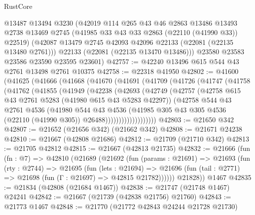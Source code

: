 \begin{lexlean}{RustCore}
\begin{coremodule}
      @13487
      @13494
      @3230
      (@42019
        @114
        @265
        @43
        @46
        @2863
        @13486
        @13493
        @2738
        @13469
        @2745
        (@41985 @33 @43 @33 @2863 (@22110 (@41990 @33)) @22519)
        (@42087 @13479 @2745 @42093 @42096 @22133 (@22081 (@22135 @13480 @2761)))
        @22133
        (@22081 (@22135 @13470 @13486)))
      @23580
      @23583
      @23586
      @23590
      @23595
      @23601)
@42757 := @42240 @13496 @615 @544 @43 @2761 @13498 @2761 @10375
@42758 := @22318 @41950
@42802 := @41600
    (@41625
      (@41666
        (@41668
          (@41670
            (@41691
              (@41709
                (@41726
                  (@41747
                    (@41758
                      (@41762
                        (@41855
                          (@41949
                            (@42238
                              (@42693
                                (@42749
                                  (@42757
                                    (@42758 @615 @43 @2761 @5283 (@41980 @615 @43 @5283 @42297))
                                    (@42758
                                      @544
                                      @43
                                      @2761
                                      @4536
                                      (@41980
                                        @544
                                        @43
                                        @4536
                                        (@41985
                                          @305
                                          @43
                                          @305
                                          @4536
                                          (@22110 (@41990 @305))
                                          @26488)))))))))))))))))))
@42803 := @21650 @342
@42807 := @21652 (@21656 @342) (@21662 @342)
@42808 := @21671 @24238
@42810 := @21667 (@42808 @21686)
@42812 := @21709 (@21710 @342)
@42813 := @21705 @42812
@42815 := @21667 (@42813 @21735)
@42832 := @21666
    (fun (fn : @7) =>
    @42810
      (@21689
        (@21692
          (fun (params : @21691) =>
          @21693
            (fun (rty : @2744) =>
            @21695
              (fun (lets : @21694) =>
              @21696 (fun (tail : @2771) => @21698 (fun (Γ : @21697) => @42815 @21782))))))
        @21828))
    @1467
@42835 := @21834 (@42808 (@21684 @1467))
@42838 := @21747 (@21748 @1467) @24241
@42842 := @21667 (@21739 (@42838 @21756) @21760)
@42843 := @21773 @1467
@42848 := @21770 (@21772 @42843 @24244 @21728 @21730)

\end{coremodule}
\end{lexlean}
